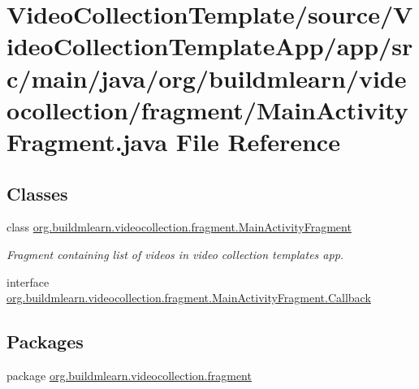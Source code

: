 \hypertarget{VideoCollectionTemplate_2source_2VideoCollectionTemplateApp_2app_2src_2main_2java_2org_2buildmle5ec78e4cdd65bc5e3b3154db5d4ed40b}{}\section{Video\+Collection\+Template/source/\+Video\+Collection\+Template\+App/app/src/main/java/org/buildmlearn/videocollection/fragment/\+Main\+Activity\+Fragment.java File Reference}
\label{VideoCollectionTemplate_2source_2VideoCollectionTemplateApp_2app_2src_2main_2java_2org_2buildmle5ec78e4cdd65bc5e3b3154db5d4ed40b}
\subsection*{Classes}
\begin{DoxyCompactItemize}
\item 
class \hyperlink{classorg_1_1buildmlearn_1_1videocollection_1_1fragment_1_1MainActivityFragment}{org.\+buildmlearn.\+videocollection.\+fragment.\+Main\+Activity\+Fragment}
\begin{DoxyCompactList}\small\item\em Fragment containing list of videos in video collection template\textquotesingle{}s app. \end{DoxyCompactList}\item 
interface \hyperlink{interfaceorg_1_1buildmlearn_1_1videocollection_1_1fragment_1_1MainActivityFragment_1_1Callback}{org.\+buildmlearn.\+videocollection.\+fragment.\+Main\+Activity\+Fragment.\+Callback}
\end{DoxyCompactItemize}
\subsection*{Packages}
\begin{DoxyCompactItemize}
\item 
package \hyperlink{namespaceorg_1_1buildmlearn_1_1videocollection_1_1fragment}{org.\+buildmlearn.\+videocollection.\+fragment}
\end{DoxyCompactItemize}
